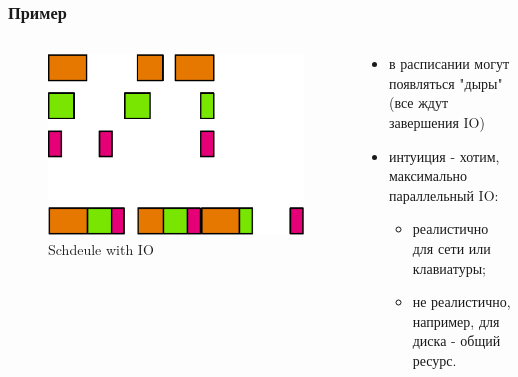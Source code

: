 \begin{frame}
\frametitle{Пример}

\begin{columns}[T]
  \begin{column}{.4\textwidth}
    \begin{figure}
      \centering\includegraphics[width=1.0\linewidth]{iosched0}
      \caption{Schdeule with IO}
    \end{figure}
  \end{column}
  \begin{column}{.6\textwidth}
    \begin{itemize}
      \item в расписании могут появляться "дыры" (все ждут завершения IO)
      \item интуиция - хотим, максимально параллельный IO:
        \begin{itemize}
          \item реалистично для сети или клавиатуры;
          \item не реалистично, например, для диска - общий ресурс.
        \end{itemize}
    \end{itemize}
  \end{column}
\end{columns}
\end{frame}

